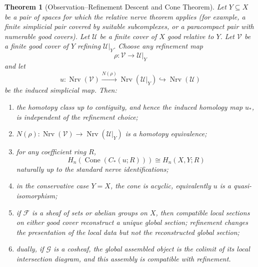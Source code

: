 \documentclass[11pt]{article}
\newtheorem{theorem}{Theorem}[section]
\newcommand{\Cone}{\operatorname{Cone}}
\newcommand{\Nrv}{\operatorname{Nrv}}
\begin{document}
\begin{theorem}[Observation--Refinement Descent and Cone Theorem]\label{thm:main}
Let $Y\subseteq X$ be a pair of spaces for which the relative nerve theorem applies (for example, a finite simplicial pair covered by suitable subcomplexes, or a paracompact pair with numerable good covers).  Let $\mathcal U$ be a finite cover of $X$ good relative to $Y$.  Let $\mathcal V$ be a finite good cover of $Y$ refining $\mathcal U|_Y$.  Choose any refinement map
\[
\rho:\mathcal V\longrightarrow\mathcal U|_Y
\]
and let
\[
u:
\Nrv(\mathcal V)\xrightarrow{N(\rho)}\Nrv(\mathcal U|_Y)
\hookrightarrow\Nrv(\mathcal U)
\]
be the induced simplicial map.  Then:
\begin{enumerate}[label=(\alph*)]
\item the homotopy class up to contiguity, and hence the induced homology map $u_*$, is independent of the refinement choice;
\item $N(\rho):\Nrv(\mathcal V)\to\Nrv(\mathcal U|_Y)$ is a homotopy equivalence;
\item for any coefficient ring $R$,
\[
H_n\!\left(\Cone(C_*(u;R))\right)
\cong H_n(X,Y;R)
\]
naturally up to the standard nerve identifications;
\item in the conservative case $Y=X$, the cone is acyclic, equivalently $u$ is a quasi-isomorphism;
\item if $\mathcal F$ is a sheaf of sets or abelian groups on $X$, then compatible local sections on either good cover reconstruct a unique global section; refinement changes the presentation of the local data but not the reconstructed global section;
\item dually, if $\mathcal G$ is a cosheaf, the global assembled object is the colimit of its local intersection diagram, and this assembly is compatible with refinement.
\end{enumerate}
\end{theorem}
\end{document}
